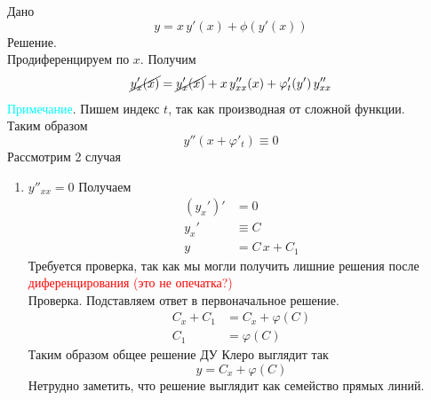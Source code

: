 \begin{Note}
    Дано
    \[
        y = x\,y'(x) + \phi(y'(x))
    \]
    Решение.\\
    Продиференцируем по $x$. Получим
    \[
        \cancel{y'_x(x)} = \cancel{y'_x(x)} + x\,y''_{xx}(x) + \varphi'_t(y')\,y''_{xx}
    \]
    \textcolor{cyan}{Примечание}. Пишем индекс $t$, так как производная от сложной функции.\\
    Таким образом
    \[
        y''(x + \varphi'_t) \equiv 0
    \]
    Рассмотрим 2 случая
    \begin{enumerate}
        \item  $y''_{xx}=0$ Получаем\\
        \begin{align*}
            (y_x')'&=0\\
            y_x' &\equiv C\\
            y&=C\,x + C_1
        \end{align*}
        Требуется проверка, так как мы могли получить лишние решения после \textcolor{red}{диференцирования (это не опечатка?)}\\
        Проверка. Подставляем ответ в первоначальное решение.\\
        \begin{align*}
            C_x + C_1 &= C_x + \varphi(C)\\
            C_1 &= \varphi(C)
        \end{align*}
        Таким образом общее решение ДУ Клеро выглядит так
        \[
            y = C_x + \varphi(C)     
        \]
        Нетрудно заметить, что решение выглядит как семейство прямых линий.
                

\end{enumerate}
\end{Note}

